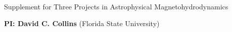 \documentclass[11pt]{NSF}  %
\begin{document}
\begin{centering}
\begin{LARGE}
Supplement for Three Projects in Astrophysical Magnetohydrodynamics
\end{LARGE}


\vspace{2mm}
{\bf PI: David C. Collins} (Florida State University)

\end{centering}
\pagestyle{plain}



%


%
\end{document}
